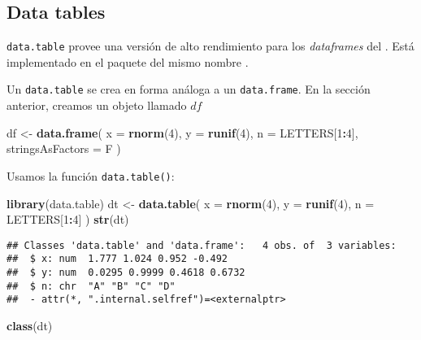 \documentclass[]{article}
\newenvironment{Shaded}{\begin{snugshade}}{\end{snugshade}}
\newcommand{\KeywordTok}[1]{\textcolor[rgb]{0.13,0.29,0.53}{\textbf{#1}}}
\newcommand{\DataTypeTok}[1]{\textcolor[rgb]{0.13,0.29,0.53}{#1}}
\newcommand{\DecValTok}[1]{\textcolor[rgb]{0.00,0.00,0.81}{#1}}
\newcommand{\StringTok}[1]{\textcolor[rgb]{0.31,0.60,0.02}{#1}}
\newcommand{\OperatorTok}[1]{\textcolor[rgb]{0.81,0.36,0.00}{\textbf{#1}}}
\newcommand{\NormalTok}[1]{#1}
\begin{document}
\subsection{Data tables}\label{data-tables}

\texttt{data.table} provee una versión de alto rendimiento para los
\emph{dataframes} del \textcite{rbase}. Está implementado en el paquete
del mismo nombre \parencite{datatable}.

Un \texttt{data.table} se crea en forma análoga a un
\texttt{data.frame}. En la sección anterior, creamos un objeto llamado
\(df\)

\begin{Shaded}
\begin{Highlighting}[]
\NormalTok{df <-}\StringTok{ }\KeywordTok{data.frame}\NormalTok{(}
  \DataTypeTok{x =} \KeywordTok{rnorm}\NormalTok{(}\DecValTok{4}\NormalTok{),}
  \DataTypeTok{y =} \KeywordTok{runif}\NormalTok{(}\DecValTok{4}\NormalTok{),}
  \DataTypeTok{n =}\NormalTok{ LETTERS[}\DecValTok{1}\OperatorTok{:}\DecValTok{4}\NormalTok{],}
  \DataTypeTok{stringsAsFactors =}\NormalTok{ F }
\NormalTok{)}
\end{Highlighting}
\end{Shaded}

Usamos la función \texttt{data.table()}:

\begin{Shaded}
\begin{Highlighting}[]
\KeywordTok{library}\NormalTok{(data.table)}
\NormalTok{dt <-}\StringTok{ }\KeywordTok{data.table}\NormalTok{(}
  \DataTypeTok{x =} \KeywordTok{rnorm}\NormalTok{(}\DecValTok{4}\NormalTok{),}
  \DataTypeTok{y =} \KeywordTok{runif}\NormalTok{(}\DecValTok{4}\NormalTok{),}
  \DataTypeTok{n =}\NormalTok{ LETTERS[}\DecValTok{1}\OperatorTok{:}\DecValTok{4}\NormalTok{]}
\NormalTok{)}
\KeywordTok{str}\NormalTok{(dt)}
\end{Highlighting}
\end{Shaded}

\begin{verbatim}
## Classes 'data.table' and 'data.frame':   4 obs. of  3 variables:
##  $ x: num  1.777 1.024 0.952 -0.492
##  $ y: num  0.0295 0.9999 0.4618 0.6732
##  $ n: chr  "A" "B" "C" "D"
##  - attr(*, ".internal.selfref")=<externalptr>
\end{verbatim}

\begin{Shaded}
\begin{Highlighting}[]
\KeywordTok{class}\NormalTok{(dt)}
\end{Highlighting}
\end{Shaded}
\end{document}
